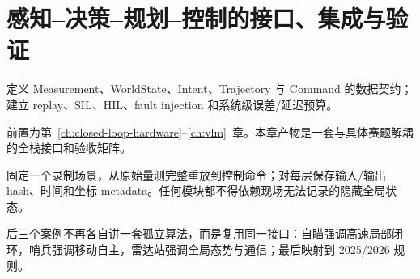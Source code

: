 \chapter{感知--决策--规划--控制的接口、集成与验证}
\label{ch:integration}

\begin{learningobjectives}
定义 Measurement、WorldState、Intent、Trajectory 与 Command 的数据契约；建立 replay、SIL、HIL、fault injection 和系统级误差/延迟预算。
\end{learningobjectives}

\begin{prerequisites}
前置为第~\ref{ch:closed-loop-hardware}--\ref{ch:vlm}~章。本章产物是一套与具体赛题解耦的全栈接口和验收矩阵。
\end{prerequisites}


\begin{engineeringcheck}
固定一个录制场景，从原始量测完整重放到控制命令；对每层保存输入/输出 hash、时间和坐标 metadata。任何模块都不得依赖现场无法记录的隐藏全局状态。
\end{engineeringcheck}

\begin{chaptertransition}
后三个案例不再各自讲一套孤立算法，而是复用同一接口：自瞄强调高速局部闭环，哨兵强调移动自主，雷达站强调全局态势与通信；最后映射到 2025/2026 规则。
\end{chaptertransition}
